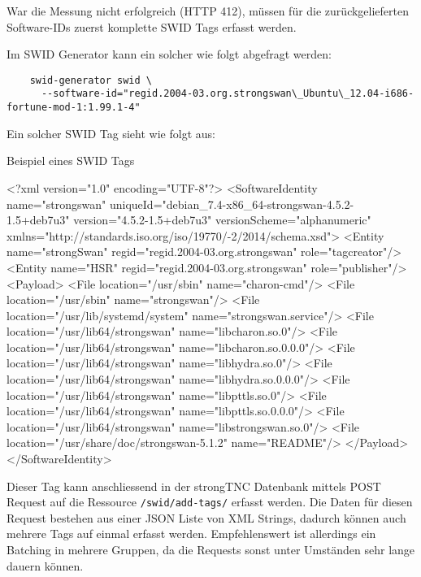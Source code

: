 \documentclass[10pt,a4paper]{scrartcl}
\begin{document}
War die Messung nicht erfolgreich (HTTP 412), müssen für die zurückgelieferten
Software-IDs zuerst komplette SWID Tags erfasst werden.

Im SWID Generator kann ein solcher wie folgt abgefragt werden:

\begin{small}\begin{verbatim}
	swid-generator swid \
	  --software-id="regid.2004-03.org.strongswan\_Ubuntu\_12.04-i686-fortune-mod-1:1.99.1-4"
\end{verbatim}\end{small}

Ein solcher SWID Tag sieht wie folgt aus:

\begin{listing}
\caption{Beispiel eines SWID Tags}
\begin{xmlcode}
<?xml version="1.0" encoding="UTF-8"?>
<SoftwareIdentity name="strongswan" 
	uniqueId="debian_7.4-x86_64-strongswan-4.5.2-1.5+deb7u3" 
	version="4.5.2-1.5+deb7u3" versionScheme="alphanumeric" 
	xmlns="http://standards.iso.org/iso/19770/-2/2014/schema.xsd">
  <Entity name="strongSwan" regid="regid.2004-03.org.strongswan" role="tagcreator"/>
  <Entity name="HSR" regid="regid.2004-03.org.strongswan" role="publisher"/>
  <Payload>
    <File location="/usr/sbin" name="charon-cmd"/>
    <File location="/usr/sbin" name="strongswan"/>
    <File location="/usr/lib/systemd/system" name="strongswan.service"/>
    <File location="/usr/lib64/strongswan" name="libcharon.so.0"/>
    <File location="/usr/lib64/strongswan" name="libcharon.so.0.0.0"/>
    <File location="/usr/lib64/strongswan" name="libhydra.so.0"/>
    <File location="/usr/lib64/strongswan" name="libhydra.so.0.0.0"/>
    <File location="/usr/lib64/strongswan" name="libpttls.so.0"/>
    <File location="/usr/lib64/strongswan" name="libpttls.so.0.0.0"/>
    <File location="/usr/lib64/strongswan" name="libstrongswan.so.0"/>
    <File location="/usr/share/doc/strongswan-5.1.2" name="README"/>
  </Payload>
</SoftwareIdentity>
\end{xmlcode}
\end{listing}

Dieser Tag kann anschliessend in der strongTNC Datenbank mittels POST Request
auf die Ressource \texttt{/swid/add-tags/} erfasst werden. Die Daten für diesen
Request bestehen aus einer JSON Liste von XML Strings, dadurch können auch
mehrere Tags auf einmal erfasst werden. Empfehlenswert ist allerdings ein
Batching in mehrere Gruppen, da die Requests sonst unter Umständen sehr lange
dauern können. 
\end{document}
